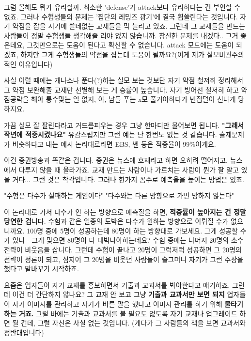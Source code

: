 그럼 올해도 뭐가 유리할까. 최소한 'defense'가 attack보다 유리하다는 건 부인할 수 없죠.
그러나 수험생들의 문제는 '집단의 레밍즈 광기'에 결국 휩쓸린다는 것입니다.
자기 약점을 잡을 시기에 쓸데없는 교재들을 막 늘리고 있죠.
그런데 그 교재들을 만드는 사람들이 정말 수험생들 생각해줄 리야 없지 않습니까.
참신한 문제를 내겠다.. 그거 좋은데요, 그것만으로는 도움이 된다고 확신할 수 없습니다.
attack 모드에는 도움이 되겠죠, 하지만 그게 수험생들의 약점을 잡는데 도움이 될까요?(이게 제가 실모비관주의적인 이유입니다)
\vspace{5mm}

사실 이럴 때에는 개나소나 푼다(?)하는 실모 보는 것보단
자기 약점 철저히 정리해서 그 약점 보완해줄 교재만 선별해 보는 게 승률이 높습니다.
자기 방어선 철저히 하고 약점공략을 해야 통수맞는 일 없지,
아, 남들 푸는 x모 풀거야하다가 빈집털이 신나게 당하지요.
\vspace{5mm}

가끔 실모 잘 팔린다라고 거드름피우는 경우 그냥 한마디만 물어보면 됩니다.
\textbf{"그래서 작년에 적중시켰나요"}
유감스럽지만 그런 예는 단 한번도 없는 것 같습니다.
출제문제가 비슷하다고 내는 예시 논리대로라면 EBS, 쏀 등은 적중율이 99$\%$이게요.
\vspace{5mm}

이건 증권방송과 똑같은 겁니다. 증권은 뉴스에 호재라고 하면 오히려 떨어지고, 뉴스에서 다루지 않을 때 올라가죠.
교재 만드는 사람이나 가르치는 사람이 뭔가 잘 알고 있을 거다... 그런 것은 착각입니다.
그러나 한가지 꼼수로 예측율을 높이는 방법은 있죠.
\vspace{5mm}

"수험은 다수가 실패하는 게임이다"
"다수와는 다른 방향으로 가면 망하지 않는다"
\vspace{5mm}

이 논리대로 가서 다수가 안 하는 방향으로 예측질을 하면, \textbf{적중률이 높아지는 건 정말 당연한 겁}니다.
수험과 같은 일종의 도박은 다수가 원하는 방향으로 이뤄질 수가 없으니까요.
100명 중에 5명이 성공하는데 80명이 하는 방향대로 가보세요. 그게 성공할 수가 있나 - 그게 맞으면 80명이 다 대박나야하는데요?
수험 중에는 나머지 20명의 소수전략이 비웃음을 삽니다. 그런데 수험이 끝나고 20명이 그럭저럭 성공하면
그 20명의 전략이 정론이 되고, 심지어 그 20명을 비웃던 사람들이 슬그머니 자기가 그런 주장을 했다고 말바꾸기 시작하죠.
\vspace{5mm}

요즘은 업자들이 자기 교재를 홍보하면서 기출과 교과서를 봐야한다고 얘기하죠.
그런데 이건 더 간단하지 않나요? 그 교재 안 보고 그냥 \textbf{기출과 교과서만 보면 되지}
업자들이 자기 이미지를 관리하고 자기가 바른 말을 했다고 이미지 관리를 하기 위해 \textbf{물타기하는 거죠.}
그럴 바에는 기출과 교과서를 볼 필요도 없도록 자기 교재나 업그레이드 하면 될 건데, 그럴 자신은 사실 없는 것입니다.
(게다가 그 사람들의 책을 보면 교과서와 정반대입니다)
\vspace{5mm}

